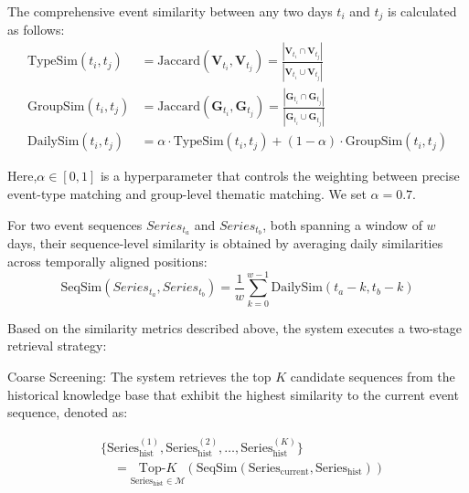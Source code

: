\documentclass[sigconf, nonacm]{acmart} %
\begin{document}

The comprehensive event similarity between any two days $t_i$ and $t_j$ is calculated as follows:
\begin{align}
    \mathrm{TypeSim}(t_i, t_j) & = \mathrm{Jaccard}(\mathbf{V}_{t_i}, \mathbf{V}_{t_j}) = \frac{|\mathbf{V}_{t_i} \cap \mathbf{V}_{t_j}|}{|\mathbf{V}_{t_i} \cup \mathbf{V}_{t_j}|} \\
    \mathrm{GroupSim}(t_i, t_j) & = \mathrm{Jaccard}(\mathbf{G}_{t_i}, \mathbf{G}_{t_j}) = \frac{|\mathbf{G}_{t_i} \cap \mathbf{G}_{t_j}|}{|\mathbf{G}_{t_i} \cup \mathbf{G}_{t_j}|} \\
    \mathrm{DailySim}(t_i, t_j) & = \alpha \cdot \mathrm{TypeSim}(t_i, t_j) + (1 - \alpha) \cdot \mathrm{GroupSim}(t_i, t_j)
\end{align}

Here,$ \alpha \in [0,1]$ is a hyperparameter that controls the weighting between precise event-type matching and group-level thematic matching. We set $ \alpha = 0.7 $.

For two event sequences $Series_{t_a}$ and $Series_{t_b}$, both spanning a window of $w$ days, 
their sequence-level similarity is obtained by averaging daily similarities across temporally aligned positions:
\begin{equation}
    \mathrm{SeqSim}(Series_{t_a}, Series_{t_b}) = \frac{1}{w} \sum_{k=0}^{w-1} \mathrm{DailySim}(t_a-k, t_b-k)
\end{equation}


Based on the similarity metrics described above, the system executes a two-stage retrieval strategy:

Coarse Screening: The system retrieves the top $K$ candidate sequences from the historical knowledge base that exhibit the highest similarity to the current event sequence, denoted as:

\begin{equation}
\begin{split}
&\{\text{Series}_{\text{hist}}^{(1)}, \text{Series}_{\text{hist}}^{(2)}, \dots, \text{Series}_{\text{hist}}^{(K)}\} \\
&\quad = \underset{\text{Series}_{\text{hist}} \in \mathcal{M}}{\text{Top-}K} \left( \mathrm{SeqSim}(\text{Series}_{\text{current}}, \text{Series}_{\text{hist}}) \right)
\end{split}
\end{equation}
\end{document}
